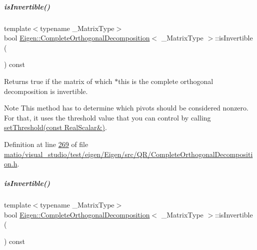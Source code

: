 \mbox{\label{group___q_r___module_a7c4f24f868295349a3bb99e5f217b069}} 
\subparagraph{\texorpdfstring{is\+Invertible()}{isInvertible()}\hspace{0.1cm}{\footnotesize\ttfamily [1/2]}}
{\footnotesize\ttfamily template$<$typename \+\_\+\+Matrix\+Type$>$ \\
bool \hyperlink{group___q_r___module_class_eigen_1_1_complete_orthogonal_decomposition}{Eigen\+::\+Complete\+Orthogonal\+Decomposition}$<$ \+\_\+\+Matrix\+Type $>$\+::is\+Invertible (\begin{DoxyParamCaption}{ }\end{DoxyParamCaption}) const\hspace{0.3cm}{\ttfamily [inline]}}

\begin{DoxyReturn}{Returns}
true if the matrix of which $\ast$this is the complete orthogonal decomposition is invertible.
\end{DoxyReturn}
\begin{DoxyNote}{Note}
This method has to determine which pivots should be considered nonzero. For that, it uses the threshold value that you can control by calling \hyperlink{group___q_r___module_aa9c9f7cbde9d58ca5552381b70ad8d82}{set\+Threshold(const Real\+Scalar\&)}. 
\end{DoxyNote}


Definition at line \hyperlink{matio_2visual__studio_2test_2eigen_2_eigen_2src_2_q_r_2_complete_orthogonal_decomposition_8h_source_l00269}{269} of file \hyperlink{matio_2visual__studio_2test_2eigen_2_eigen_2src_2_q_r_2_complete_orthogonal_decomposition_8h_source}{matio/visual\+\_\+studio/test/eigen/\+Eigen/src/\+Q\+R/\+Complete\+Orthogonal\+Decomposition.\+h}.

\mbox{\label{group___q_r___module_a7c4f24f868295349a3bb99e5f217b069}} 
\subparagraph{\texorpdfstring{is\+Invertible()}{isInvertible()}\hspace{0.1cm}{\footnotesize\ttfamily [2/2]}}
{\footnotesize\ttfamily template$<$typename \+\_\+\+Matrix\+Type$>$ \\
bool \hyperlink{group___q_r___module_class_eigen_1_1_complete_orthogonal_decomposition}{Eigen\+::\+Complete\+Orthogonal\+Decomposition}$<$ \+\_\+\+Matrix\+Type $>$\+::is\+Invertible (\begin{DoxyParamCaption}{ }\end{DoxyParamCaption}) const\hspace{0.3cm}{\ttfamily [inline]}}


